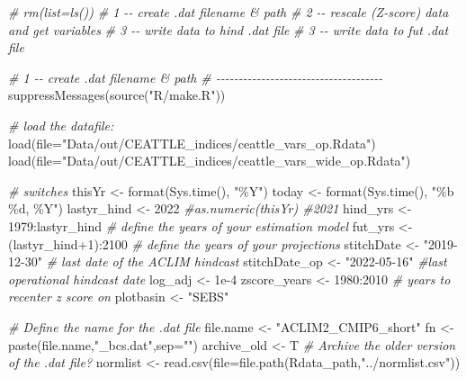 \documentclass[
]{article}
\newenvironment{Shaded}{\begin{snugshade}}{\end{snugshade}}
\newcommand{\AttributeTok}[1]{\textcolor[rgb]{0.77,0.63,0.00}{#1}}
\newcommand{\CommentTok}[1]{\textcolor[rgb]{0.56,0.35,0.01}{\textit{#1}}}
\newcommand{\DecValTok}[1]{\textcolor[rgb]{0.00,0.00,0.81}{#1}}
\newcommand{\FloatTok}[1]{\textcolor[rgb]{0.00,0.00,0.81}{#1}}
\newcommand{\FunctionTok}[1]{\textcolor[rgb]{0.00,0.00,0.00}{#1}}
\newcommand{\NormalTok}[1]{#1}
\newcommand{\OtherTok}[1]{\textcolor[rgb]{0.56,0.35,0.01}{#1}}
\newcommand{\SpecialCharTok}[1]{\textcolor[rgb]{0.00,0.00,0.00}{#1}}
\newcommand{\StringTok}[1]{\textcolor[rgb]{0.31,0.60,0.02}{#1}}
\begin{document}
\begin{Shaded}
\begin{Highlighting}[]
\CommentTok{\# rm(list=ls())}
\CommentTok{\# 1 {-}{-} create .dat filename \& path}
\CommentTok{\# 2 {-}{-} rescale (Z{-}score) data and get variables}
\CommentTok{\# 3 {-}{-} write data to hind .dat file}
\CommentTok{\# 3 {-}{-} write data to fut  .dat file}

\CommentTok{\# 1 {-}{-} create .dat filename \& path}
\CommentTok{\# {-}{-}{-}{-}{-}{-}{-}{-}{-}{-}{-}{-}{-}{-}{-}{-}{-}{-}{-}{-}{-}{-}{-}{-}{-}{-}{-}{-}{-}{-}{-}{-}{-}{-}{-}{-}{-}}
\FunctionTok{suppressMessages}\NormalTok{(}\FunctionTok{source}\NormalTok{(}\StringTok{"R/make.R"}\NormalTok{))}

\CommentTok{\# load the datafile:}
\FunctionTok{load}\NormalTok{(}\AttributeTok{file=}\StringTok{"Data/out/CEATTLE\_indices/ceattle\_vars\_op.Rdata"}\NormalTok{)}
\FunctionTok{load}\NormalTok{(}\AttributeTok{file=}\StringTok{"Data/out/CEATTLE\_indices/ceattle\_vars\_wide\_op.Rdata"}\NormalTok{)}

\CommentTok{\# switches }
\NormalTok{thisYr }\OtherTok{\textless{}{-}} \FunctionTok{format}\NormalTok{(}\FunctionTok{Sys.time}\NormalTok{(), }\StringTok{"\%Y"}\NormalTok{)}
\NormalTok{today  }\OtherTok{\textless{}{-}} \FunctionTok{format}\NormalTok{(}\FunctionTok{Sys.time}\NormalTok{(), }\StringTok{"\%b \%d, \%Y"}\NormalTok{)}
\NormalTok{lastyr\_hind }\OtherTok{\textless{}{-}} \DecValTok{2022} \CommentTok{\#as.numeric(thisYr)  \#2021}
\NormalTok{hind\_yrs    }\OtherTok{\textless{}{-}} \DecValTok{1979}\SpecialCharTok{:}\NormalTok{lastyr\_hind   }\CommentTok{\# define the years of your estimation model}
\NormalTok{fut\_yrs     }\OtherTok{\textless{}{-}}\NormalTok{ (lastyr\_hind}\SpecialCharTok{+}\DecValTok{1}\NormalTok{)}\SpecialCharTok{:}\DecValTok{2100}   \CommentTok{\# define the years of your projections}
\NormalTok{stitchDate     }\OtherTok{\textless{}{-}} \StringTok{"2019{-}12{-}30"}  \CommentTok{\# last date of the ACLIM hindcast}
\NormalTok{stitchDate\_op  }\OtherTok{\textless{}{-}} \StringTok{"2022{-}05{-}16"}  \CommentTok{\#last operational hindcast date}
\NormalTok{log\_adj      }\OtherTok{\textless{}{-}} \FloatTok{1e{-}4}
\NormalTok{zscore\_years }\OtherTok{\textless{}{-}} \DecValTok{1980}\SpecialCharTok{:}\DecValTok{2010}  \CommentTok{\# years to recenter z score on}
\NormalTok{plotbasin    }\OtherTok{\textless{}{-}} \StringTok{"SEBS"}  

\CommentTok{\# Define the name for the .dat file}
\NormalTok{file.name   }\OtherTok{\textless{}{-}} \StringTok{"ACLIM2\_CMIP6\_short"}
\NormalTok{fn          }\OtherTok{\textless{}{-}} \FunctionTok{paste}\NormalTok{(file.name,}\StringTok{"\_bcs.dat"}\NormalTok{,}\AttributeTok{sep=}\StringTok{""}\NormalTok{)}
\NormalTok{archive\_old }\OtherTok{\textless{}{-}}\NormalTok{ T  }\CommentTok{\# Archive the older version of the .dat file?}
\NormalTok{normlist    }\OtherTok{\textless{}{-}} \FunctionTok{read.csv}\NormalTok{(}\AttributeTok{file=}\FunctionTok{file.path}\NormalTok{(Rdata\_path,}\StringTok{"../normlist.csv"}\NormalTok{))}


\end{Highlighting}
\end{Shaded}
\end{document}

